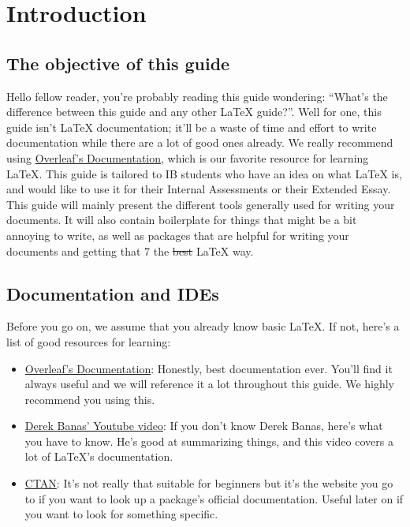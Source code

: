 \section{Introduction}
\subsection{The objective of this guide}
Hello fellow reader, you're probably reading this guide wondering:
``What's the difference between this guide and any other \LaTeX{} guide?''.
Well for one, this guide isn't \LaTeX{} documentation;
it'll be a waste of time and effort to write documentation while there are a lot of good ones already.
We really recommend using \href{https://www.overleaf.com/learn/latex/Main_Page}{Overleaf's Documentation},
which is our favorite resource for learning \LaTeX{}.
This guide is tailored to IB students who have an idea on what \LaTeX{} is,
and would like to use it for their Internal Assessments or their Extended Essay.
This guide will mainly present the different tools generally used for writing your documents.
It will also contain boilerplate for things that might be a bit annoying to write,
as well as packages that are helpful for writing your documents and getting that 7 the \sout{best} \LaTeX{} way.

\subsection{Documentation and IDEs}
Before you go on, we assume that you already know basic \LaTeX{}.
If not, here's a list of good resources for learning:
\begin{itemize}
\item \href{https://www.overleaf.com/learn/latex/Main_Page}{Overleaf's Documentation}:
Honestly, best documentation ever.
You'll find it always useful and we will reference it a lot throughout this guide.
We highly recommend you using this.
\item \href{https://www.youtube.com/watch?v=VhmkLrOjLsw}{Derek Banas' Youtube video}:
If you don't know Derek Banas, here's what you have to know.
He's good at summarizing things, and this video covers a lot of \LaTeX{}'s documentation.
\item \href{https://ctan.org/}{CTAN}: It's not really that suitable for beginners but
it's the website you go to if you want to look up a package's official documentation.
Useful later on if you want to look for something specific.
\end{itemize}

